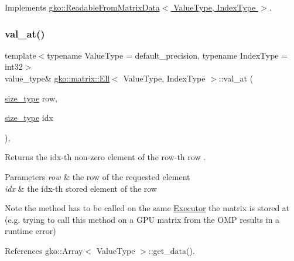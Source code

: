 Implements \hyperlink{classgko_1_1ReadableFromMatrixData_add5c12e23b3ac3c8fbd607fa5a9656bb}{gko\+::\+Readable\+From\+Matrix\+Data$<$ Value\+Type, Index\+Type $>$}.

\mbox{\label{classgko_1_1matrix_1_1Ell_a0d2365837e44dc1889fc16000ff3b0a9}} 
\subsubsection{\texorpdfstring{val\+\_\+at()}{val\_at()}\hspace{0.1cm}{\footnotesize\ttfamily [1/2]}}
{\footnotesize\ttfamily template$<$typename Value\+Type = default\+\_\+precision, typename Index\+Type = int32$>$ \\
value\+\_\+type\& \hyperlink{classgko_1_1matrix_1_1Ell}{gko\+::matrix\+::\+Ell}$<$ Value\+Type, Index\+Type $>$\+::val\+\_\+at (\begin{DoxyParamCaption}\item[{\hyperlink{namespacegko_a6e5c95df0ae4e47aab2f604a22d98ee7}{size\+\_\+type}}]{row,  }\item[{\hyperlink{namespacegko_a6e5c95df0ae4e47aab2f604a22d98ee7}{size\+\_\+type}}]{idx }\end{DoxyParamCaption})\hspace{0.3cm}{\ttfamily [inline]}, {\ttfamily [noexcept]}}



Returns the {\ttfamily idx}-\/th non-\/zero element of the {\ttfamily row}-\/th row . 


\begin{DoxyParams}{Parameters}
{\em row} & the row of the requested element \\
\hline
{\em idx} & the idx-\/th stored element of the row\\
\hline
\end{DoxyParams}
\begin{DoxyNote}{Note}
the method has to be called on the same \hyperlink{classgko_1_1Executor}{Executor} the matrix is stored at (e.\+g. trying to call this method on a G\+PU matrix from the O\+MP results in a runtime error) 
\end{DoxyNote}


References gko\+::\+Array$<$ Value\+Type $>$\+::get\+\_\+data().

\mbox{\label{classgko_1_1matrix_1_1Ell_a3591fa0ab2ec09b43a15b0f0649d8ea3}} 
